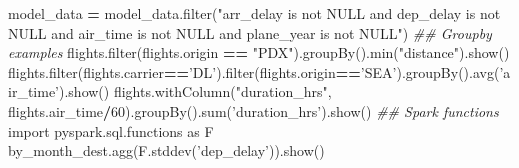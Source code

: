 \documentclass[]{book}
\newenvironment{Shaded}{\begin{snugshade}}{\end{snugshade}}
\newcommand{\DecValTok}[1]{\textcolor[rgb]{0.00,0.00,0.81}{#1}}
\newcommand{\StringTok}[1]{\textcolor[rgb]{0.31,0.60,0.02}{#1}}
\newcommand{\ImportTok}[1]{#1}
\newcommand{\CommentTok}[1]{\textcolor[rgb]{0.56,0.35,0.01}{\textit{#1}}}
\newcommand{\OperatorTok}[1]{\textcolor[rgb]{0.81,0.36,0.00}{\textbf{#1}}}
\newcommand{\BuiltInTok}[1]{#1}
\newcommand{\NormalTok}[1]{#1}
\begin{document}
\begin{Shaded}
\begin{Highlighting}[]
\NormalTok{model_data }\OperatorTok{=}\NormalTok{ model_data.}\BuiltInTok{filter}\NormalTok{(}\StringTok{"arr_delay is not NULL and dep_delay is not NULL and air_time is not NULL and plane_year is not NULL"}\NormalTok{)}
\CommentTok{## Groupby examples}
\NormalTok{flights.}\BuiltInTok{filter}\NormalTok{(flights.origin }\OperatorTok{==} \StringTok{"PDX"}\NormalTok{).groupBy().}\BuiltInTok{min}\NormalTok{(}\StringTok{"distance"}\NormalTok{).show()}
\NormalTok{flights.}\BuiltInTok{filter}\NormalTok{(flights.carrier}\OperatorTok{==}\StringTok{'DL'}\NormalTok{).}\BuiltInTok{filter}\NormalTok{(flights.origin}\OperatorTok{==}\StringTok{'SEA'}\NormalTok{).groupBy().avg(}\StringTok{'air_time'}\NormalTok{).show()}
\NormalTok{flights.withColumn(}\StringTok{"duration_hrs"}\NormalTok{, flights.air_time}\OperatorTok{/}\DecValTok{60}\NormalTok{).groupBy().}\BuiltInTok{sum}\NormalTok{(}\StringTok{'duration_hrs'}\NormalTok{).show()}
\CommentTok{## Spark functions}
\ImportTok{import}\NormalTok{ pyspark.sql.functions }\ImportTok{as}\NormalTok{ F}
\NormalTok{by_month_dest.agg(F.stddev(}\StringTok{'dep_delay'}\NormalTok{)).show()}
\end{Highlighting}
\end{Shaded}
\end{document}
